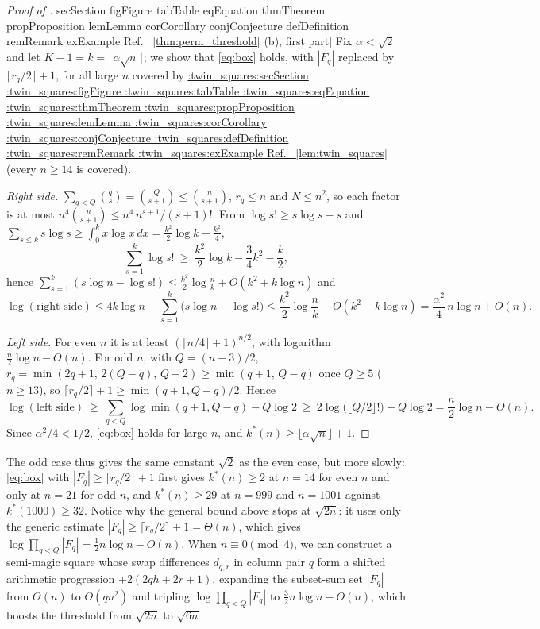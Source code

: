 \documentclass[11pt,a4paper]{article}
\makeatletter
\def\Cref@getprefix#1:#2\relax{#1}
\def\Cref@prefix@sec{sec}
\def\Cref@prefix@fig{fig}
\def\Cref@prefix@tab{tab}
\def\Cref@prefix@eq{eq}
\def\Cref@prefix@thm{thm}
\def\Cref@prefix@prop{prop}
\def\Cref@prefix@lem{lem}
\def\Cref@prefix@cor{cor}
\def\Cref@prefix@conj{conj}
\def\Cref@prefix@def{def}
\def\Cref@prefix@rem{rem}
\def\Cref@prefix@ex{ex}
\def\Cref@type@cap#1{%
  \edef\Cref@tmp{#1}%
  \ifx\Cref@tmp\Cref@prefix@sec Section%
  \else\ifx\Cref@tmp\Cref@prefix@fig Figure%
  \else\ifx\Cref@tmp\Cref@prefix@tab Table%
  \else\ifx\Cref@tmp\Cref@prefix@eq Equation%
  \else\ifx\Cref@tmp\Cref@prefix@thm Theorem%
  \else\ifx\Cref@tmp\Cref@prefix@prop Proposition%
  \else\ifx\Cref@tmp\Cref@prefix@lem Lemma%
  \else\ifx\Cref@tmp\Cref@prefix@cor Corollary%
  \else\ifx\Cref@tmp\Cref@prefix@conj Conjecture%
  \else\ifx\Cref@tmp\Cref@prefix@def Definition%
  \else\ifx\Cref@tmp\Cref@prefix@rem Remark%
  \else\ifx\Cref@tmp\Cref@prefix@ex Example%
  \else Ref.%
  \fi\fi\fi\fi\fi\fi\fi\fi\fi\fi\fi\fi
}
\DeclareRobustCommand{\Cref}[1]{%
  \begingroup
  \edef\Cref@label{#1}%
  \edef\Cref@prefix{\expandafter\Cref@getprefix\Cref@label:\relax}%
  \hyperref[#1]{\Cref@type@cap{\Cref@prefix}~\ref*{#1}}%
  \endgroup
}
\theoremstyle{plain}
\theoremstyle{definition}
\theoremstyle{remark}
\makeatother
\begin{document}
\begin{proof}[Proof of \Cref{thm:perm_threshold}(b), first part]
Fix $\alpha<\sqrt2$ and let $K-1=k=\lfloor\alpha\sqrt n\rfloor$; we show that \eqref{eq:box} holds, with $|F_q|$ replaced by $\lceil r_q/2\rceil+1$, for all large $n$ covered by \Cref{lem:twin_squares} (every $n\ge14$ is covered).

\emph{Right side.} $\sum_{q<Q}\binom qs=\binom Q{s+1}\le\binom n{s+1}$, $r_q\le n$ and $N\le n^2$, so each factor is at most $n^4\binom n{s+1}\le n^4\,n^{s+1}/(s+1)!$.
From $\log s!\ge s\log s-s$ and $\sum_{s\le k}s\log s\ge\int_0^kx\log x\,dx=\frac{k^2}2\log k-\frac{k^2}4$,
\[
\sum_{s=1}^{k}\log s!\ \ge\ \frac{k^2}2\log k-\frac34k^2-\frac k2 ,
\]
hence $\sum_{s=1}^{k}(s\log n-\log s!)\le\frac{k^2}2\log\frac nk+O(k^2+k\log n)$ and
\[
\log(\text{right side})\le4k\log n+\sum_{s=1}^{k}\bigl(s\log n-\log s!\bigr)\le\frac{k^2}2\log\frac nk+O(k^2+k\log n)=\frac{\alpha^2}4\,n\log n+O(n).
\]

\emph{Left side.} For even $n$ it is at least $(\lceil n/4\rceil+1)^{n/2}$, with logarithm $\frac n2\log n-O(n)$.
For odd $n$, with $Q=(n-3)/2$, $r_q=\min(2q+1,\,2(Q-q),\,Q-2)\ge\min(q+1,\,Q-q)$ once $Q\ge5$ ($n\ge13$), so $\lceil r_q/2\rceil+1\ge\min(q+1,Q-q)/2$.
Hence
\[
\log(\text{left side})\ \ge\ \sum_{q<Q}\log\min(q+1,Q-q)-Q\log2\ \ge\ 2\log\bigl(\lfloor Q/2\rfloor!\bigr)-Q\log2=\frac n2\log n-O(n).
\]
Since $\alpha^2/4<1/2$, \eqref{eq:box} holds for large $n$, and $k^*(n)\ge\lfloor\alpha\sqrt n\rfloor+1$.
\end{proof}

The odd case thus gives the same constant $\sqrt2$ as the even case, but more slowly: \eqref{eq:box} with $|F_q|\ge\lceil r_q/2\rceil+1$ first gives $k^*(n)\ge2$ at $n=14$ for even $n$ and only at $n=21$ for odd $n$, and $k^*(n)\ge29$ at $n=999$ and $n=1001$ against $k^*(1000)\ge32$.
Notice why the general bound above stops at $\sqrt{2n}$: it uses only the generic estimate $|F_q|\ge\lceil r_q/2\rceil+1=\Theta(n)$, which gives $\log\prod_{q<Q}|F_q|=\frac12n\log n-O(n)$. When $n\equiv0\pmod 4$, we can construct a semi-magic square whose swap differences $d_{q,r}$ in column pair $q$ form a shifted arithmetic progression $\mp2(2qh+2r+1)$, expanding the subset-sum set $|F_q|$ from $\Theta(n)$ to $\Theta(qn^2)$ and tripling $\log\prod_{q<Q}|F_q|$ to $\frac32n\log n-O(n)$, which boosts the threshold from $\sqrt{2n}$ to $\sqrt{6n}$.
\end{document}
